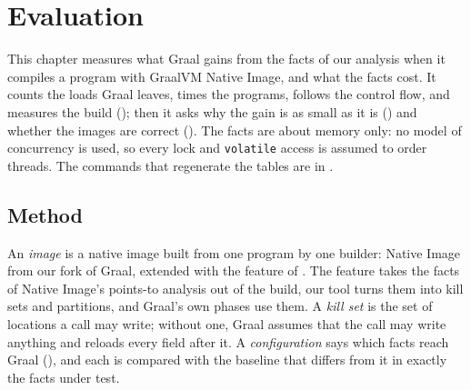 \chapter{Evaluation}\label{chap:evaluation}

\newcommand{\pct}[1]{\ensuremath{#1\,\%}}

This chapter measures what Graal gains from the facts of our analysis when it compiles a program with GraalVM Native Image,
and what the facts cost. It counts the loads Graal leaves, times the programs, follows the control flow, and measures the
build (); then it asks why the gain is as small as it is () and
whether the images are correct (). The facts are about memory only: no model of concurrency is used,
so every lock and \texttt{volatile} access is assumed to order threads. The commands that regenerate the tables are in
.

\section{Method}\label{sec:eval-method}

An \emph{image} is a native image built from one program by one builder: Native Image from our fork of Graal, extended
with the feature of . The feature takes the facts of Native Image's points-to analysis out of the
build, our tool turns them into kill sets and partitions, and Graal's own phases use them. A \emph{kill set} is the set of
locations a call may write; without one, Graal assumes that the call may write anything and reloads every field after it. A
\emph{configuration} says which facts reach Graal (), and each is compared with the baseline
that differs from it in exactly the facts under test.

